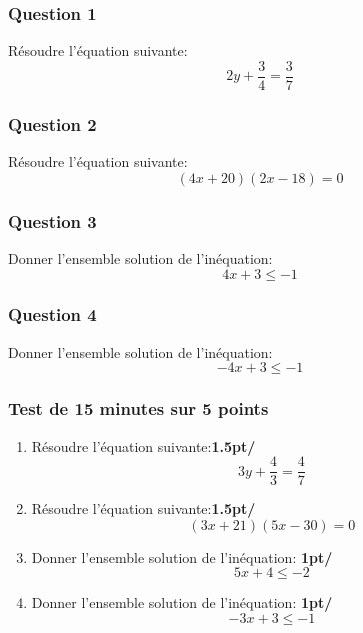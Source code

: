 \documentclass[t,12pt]{beamer}
\begin{document}
\begin{frame}
	\frametitle{Question 1}
Résoudre l'équation suivante:
$$2y+\dfrac{3}{4} = \dfrac{3}{7}$$
\end{frame}

\begin{frame}
\frametitle{Question 2}
Résoudre l'équation suivante:
$$(4x+20)(2x-18) = 0$$

\end{frame}


\begin{frame}
\frametitle{Question 3}
Donner l'ensemble solution de l'inéquation:
$$4x+3 \leq -1$$
\end{frame}

\begin{frame}
	\frametitle{Question 4}
	Donner l'ensemble solution de l'inéquation:
	$$-4x+3 \leq -1$$
\end{frame}

\begin{frame} \end{frame}

\begin{frame}
	\frametitle{Test de 15 minutes sur 5 points}
\begin{enumerate}
	\item Résoudre l'équation suivante:\hfill\textbf{1.5pt/}
	$$3y+\dfrac{4}{3} = \dfrac{4}{7}$$
	\item Résoudre l'équation suivante:\hfill\textbf{1.5pt/}
	$$(3x+21)(5x-30) = 0$$
	\item Donner l'ensemble solution de l'inéquation: \hfill\textbf{1pt/}
	$$5x+4 \leq -2$$
	\item Donner l'ensemble solution de l'inéquation: \hfill\textbf{1pt/}
	$$-3x+3 \leq -1$$
\end{enumerate}
\end{frame}
\end{document}
